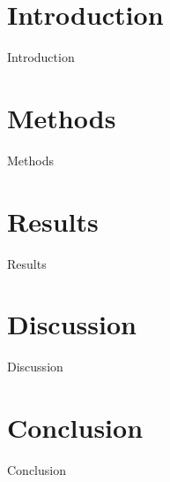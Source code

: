 \documentclass[oneside]{report}
\begin{document}

	\tableofcontents
	\listoffigures
	\clearpage
{}
	\begin{abstract}
		{Abstract}
	\end{abstract}

	\chapter{Introduction}
		{Introduction}
	\chapter{Methods}
		{Methods}
	\chapter{Results}
		{Results}
	\chapter{Discussion}
		{Discussion}
	\chapter{Conclusion}
		{Conclusion}
	\clearpage
	
	
\end{document}
